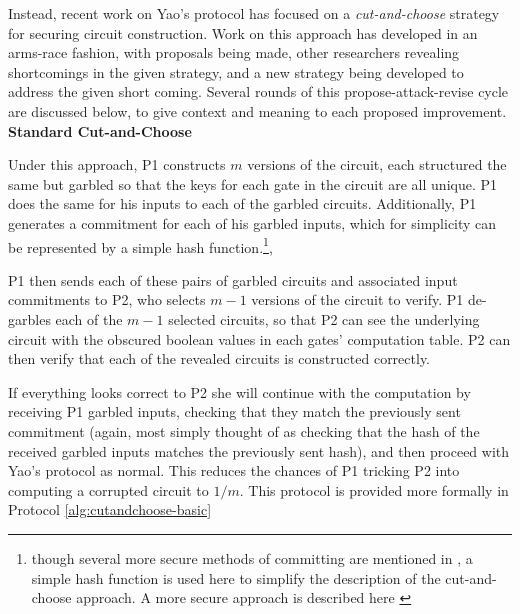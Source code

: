 Instead, recent work on Yao's protocol has focused on a \emph{cut-and-choose} strategy for securing circuit construction\cite{malkhi2004fairplay}. Work on this approach has developed in an arms-race fashion, with proposals being made, other researchers revealing shortcomings in the given strategy, and a new strategy being developed to address the given short coming. Several rounds of this propose-attack-revise cycle are discussed below, to give context and meaning to each proposed improvement.\\[.5em]

\noindent\textbf{Standard Cut-and-Choose}

Under this approach, \ac{P1} constructs $m$ versions of the circuit, each structured the same but garbled so that the keys for each gate in the circuit are all unique. \ac{P1} does the same for his inputs to each of the garbled circuits. Additionally, \ac{P1} generates a commitment for each of his garbled inputs, which for simplicity can be represented by a simple hash function.\footnote{though several more secure methods of committing are mentioned in \cite{lindell2007efficient}, a simple hash function is used here to simplify the description of the cut-and-choose approach.  A more secure approach is described here \cite{halevi1996practical}},

\ac{P1} then sends each of these pairs of garbled circuits and associated input commitments to \ac{P2}, who selects $m-1$ versions of the circuit to verify.  \ac{P1} de-garbles each of the $m-1$ selected circuits, so that \ac{P2} can see the underlying circuit with the obscured boolean values in each gates' computation table.  \ac{P2} can then verify that each of the revealed circuits is constructed correctly.

If everything looks correct to \ac{P2} she will continue with the computation by receiving \ac{P1} garbled inputs, checking that they match the previously sent commitment (again, most simply thought of as checking that the hash of the received garbled inputs matches the previously sent hash), and then proceed with Yao's protocol as normal. This reduces the chances of \ac{P1} tricking \ac{P2} into computing a corrupted circuit to $1/m$. This protocol is provided more formally in Protocol \ref{alg:cutandchoose-basic}

